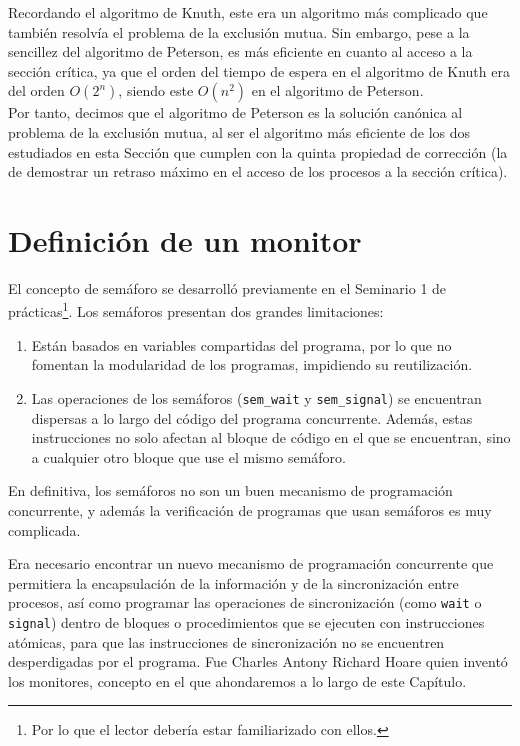 Recordando el algoritmo de Knuth, este era un algoritmo más complicado que también resolvía el problema de la exclusión mutua. Sin embargo, pese a la sencillez del algoritmo de Peterson, es más eficiente en cuanto al acceso a la sección crítica, ya que el orden del tiempo de espera en el algoritmo de Knuth era del orden $O(2^n)$, siendo este $O(n^2)$ en el algoritmo de Peterson.\\

Por tanto, decimos que el algoritmo de Peterson es la solución canónica al problema de la exclusión mutua, al ser el algoritmo más eficiente de los dos estudiados en esta Sección que cumplen con la quinta propiedad de corrección (la de demostrar un retraso máximo en el acceso de los procesos a la sección crítica).


\section{Definición de un monitor}
El concepto de semáforo se desarrolló previamente en el Seminario 1 de prácticas\footnote{Por lo que el lector debería estar familiarizado con ellos.}. Los semáforos presentan dos grandes limitaciones:
\begin{enumerate}
    \item Están basados en variables compartidas del programa, por lo que no fomentan la modularidad de los programas, impidiendo su reutilización.
    \item Las operaciones de los semáforos (\verb|sem_wait| y \verb|sem_signal|) se encuentran dispersas a lo largo del código del programa concurrente. Además, estas instrucciones no solo afectan al bloque de código en el que se encuentran, sino a cualquier otro bloque que use el mismo semáforo.
\end{enumerate}
En definitiva, los semáforos no son un buen mecanismo de programación concurrente, y además la verificación de programas que usan semáforos es muy complicada. 

Era necesario encontrar un nuevo mecanismo de programación concurrente que permitiera la encapsulación de la información y de la sincronización entre procesos, así como programar las operaciones de sincronización (como \verb|wait| o \verb|signal|) dentro de bloques o procedimientos que se ejecuten con instrucciones atómicas, para que las instrucciones de sincronización no se encuentren desperdigadas por el programa.
Fue Charles Antony Richard Hoare quien inventó los monitores, concepto en el que ahondaremos a lo largo de este Capítulo.\\


